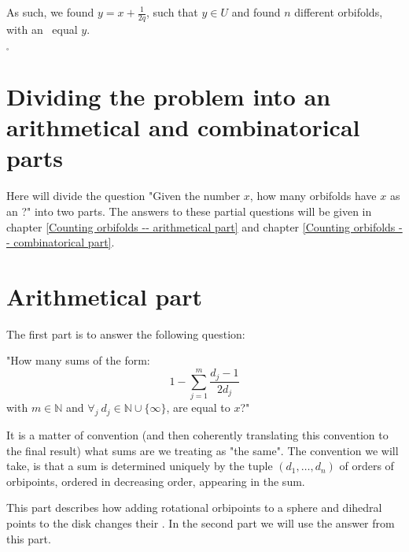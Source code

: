 As such, we found $y = x + \frac{1}{2q}$, such that $y \in U$ and 
found $n$
different orbifolds, with an \Eoc\ equal $y$. 

$_\square$ 
 



\section{Dividing the problem into an arithmetical and combinatorical parts}
\label{dividing the problem}
Here will divide the question "Given the number $x$, how many orbifolds have $x$ as an \Eoc?" 
into two parts. The answers to these partial questions will be given in chapter
\ref{Counting orbifolds -- arithmetical part} and chapter
\ref{Counting orbifolds -- combinatorical part}.   
\section{Arithmetical part}\label{arithmetical part}
The first part is to answer the following question:

"How many sums of the form:
\begin{equation}\label{counting D2}
1-\sum_{j=1}^m \frac{d_j-1}{2d_j} 
\end{equation} 
with $m\in \mathbb{N}$ and $\forall_j\ d_j\in\mathbb{N}\cup\{\infty\}$, are equal to $x$?"

It is a matter of convention (and then coherently translating this convention to the final result) 
what sums are we treating as "the same". The convention we will take, is that a sum is determined 
uniquely by the tuple $(d_1,\dots,d_n)$ 
of orders 
of orbipoints, ordered in decreasing order, appearing in the sum. 

This part describes how adding rotational orbipoints to a sphere and dihedral points 
to the disk changes their \Eoc. 
In the second part we will use the answer from this part.

